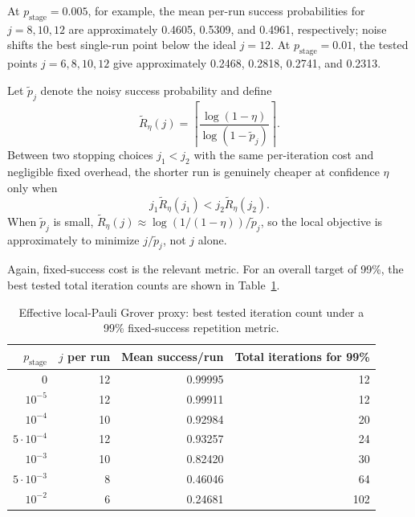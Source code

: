 \documentclass[pdflatex,sn-nature]{sn-jnl}
\theoremstyle{thmstyleone}
\theoremstyle{thmstyletwo}
\begin{document}
At $p_{\mathrm{stage}}=0.005$, for example, the mean per-run success probabilities for $j=8,10,12$ are approximately 0.4605, 0.5309, and 0.4961, respectively; noise shifts the best single-run point below the ideal $j=12$. At $p_{\mathrm{stage}}=0.01$, the tested points $j=6,8,10,12$ give approximately 0.2468, 0.2818, 0.2741, and 0.2313.

Let $\widetilde p_j$ denote the noisy success probability and define
\begin{equation}
    \widetilde R_{\eta}(j)=
    \left\lceil
    \frac{\log(1-\eta)}{\log(1-\widetilde p_j)}
    \right\rceil .
\end{equation}
Between two stopping choices $j_1<j_2$ with the same per-iteration cost and negligible fixed overhead, the shorter run is genuinely cheaper at confidence $\eta$ only when
\begin{equation}
    j_1\widetilde R_{\eta}(j_1)
    <
    j_2\widetilde R_{\eta}(j_2).
    \label{eq:noisy_stopping_criterion}
\end{equation}
When $\widetilde p_j$ is small, $\widetilde R_{\eta}(j)\approx\log(1/(1-\eta))/\widetilde p_j$, so the local objective is approximately to minimize $j/\widetilde p_j$, not $j$ alone.

Again, fixed-success cost is the relevant metric. For an overall target of 99\%, the best tested total iteration counts are shown in Table~\ref{tab:noisy_fixed}.

\begin{table}[t]
\centering
\caption{Effective local-Pauli Grover proxy: best tested iteration count under a 99\% fixed-success repetition metric.}
\label{tab:noisy_fixed}
\begin{tabular}{rrrr}
\toprule
$p_{\mathrm{stage}}$ & $j$ per run & Mean success/run & Total iterations for 99\%\\
\midrule
0 & 12 & 0.99995 & 12\\
$10^{-5}$ & 12 & 0.99911 & 12\\
$10^{-4}$ & 10 & 0.92984 & 20\\
$5\cdot10^{-4}$ & 12 & 0.93257 & 24\\
$10^{-3}$ & 10 & 0.82420 & 30\\
$5\cdot10^{-3}$ & 8 & 0.46046 & 64\\
$10^{-2}$ & 6 & 0.24681 & 102\\
\bottomrule
\end{tabular}
\end{table}
\end{document}
